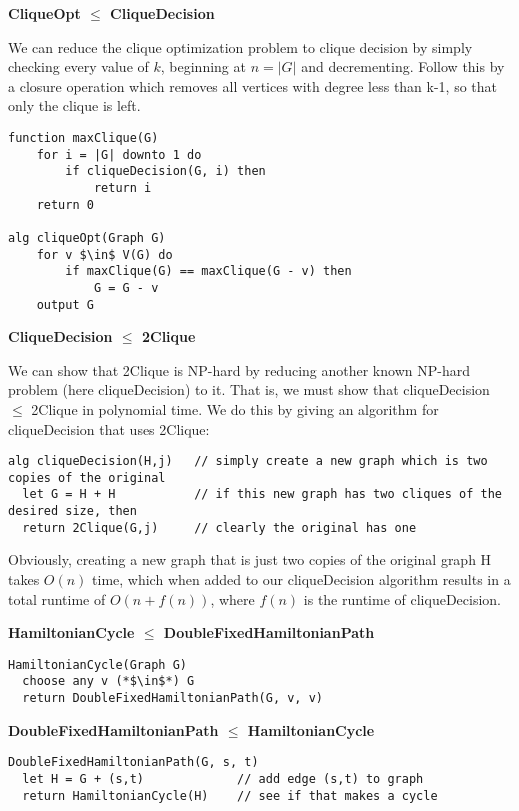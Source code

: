 \documentclass[12pt]{article}
\providecommand{\reducible}[2]{
  \textbf{#1} $\leq$ \textbf{#2}
}
\begin{document}
\begin{centering}\textbf{\reducible{CliqueOpt}{CliqueDecision}}\par\end{centering}
We can reduce the clique optimization problem to clique decision by simply checking every value of $k$,
beginning at $n = |G|$ and decrementing.
Follow this by a closure operation which removes all vertices with degree less than k-1,
so that only the clique is left.
\begin{lstlisting}
function maxClique(G)
    for i = |G| downto 1 do
        if cliqueDecision(G, i) then
            return i
    return 0

alg cliqueOpt(Graph G)
    for v $\in$ V(G) do
        if maxClique(G) == maxClique(G - v) then
            G = G - v
    output G
\end{lstlisting}

\begin{centering}\textbf{\reducible{CliqueDecision}{2Clique}}\par\end{centering}
We can show that 2Clique is NP-hard by reducing another known NP-hard problem (here cliqueDecision) to it.
That is, we must show that cliqueDecision $\leq$ 2Clique in polynomial time.
We do this by giving an algorithm for cliqueDecision that uses 2Clique:
\begin{lstlisting}
alg cliqueDecision(H,j)   // simply create a new graph which is two copies of the original
  let G = H + H           // if this new graph has two cliques of the desired size, then
  return 2Clique(G,j)     // clearly the original has one
\end{lstlisting}
Obviously, creating a new graph that is just two copies of the original graph H takes $O(n)$ time, which when added to our cliqueDecision algorithm results in a total runtime of $O(n + f(n))$, where $f(n)$ is the runtime of cliqueDecision.


\begin{centering}\textbf{\reducible{HamiltonianCycle}{DoubleFixedHamiltonianPath}}\par\end{centering}
\begin{lstlisting}
HamiltonianCycle(Graph G)
  choose any v (*$\in$*) G
  return DoubleFixedHamiltonianPath(G, v, v)
\end{lstlisting}

\begin{centering}\textbf{\reducible{DoubleFixedHamiltonianPath}{HamiltonianCycle}}\par\end{centering}
\begin{lstlisting}
DoubleFixedHamiltonianPath(G, s, t)
  let H = G + (s,t)             // add edge (s,t) to graph
  return HamiltonianCycle(H)    // see if that makes a cycle
\end{lstlisting}
\end{document}
